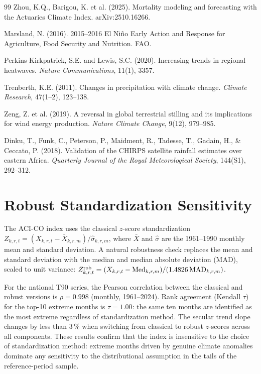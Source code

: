 \documentclass[12pt]{article}
\begin{document}
\begin{thebibliography}{99}
Zhou, K.Q., Barigou, K. et al. (2025).
Mortality modeling and forecasting with the Actuaries Climate Index.
arXiv:2510.16266.
 
Marsland, N. (2016).
2015--2016 El Ni\~no Early Action and Response for Agriculture, Food Security and Nutrition.
FAO.
 
Perkins-Kirkpatrick, S.E. and Lewis, S.C. (2020).
Increasing trends in regional heatwaves.
\emph{Nature Communications}, 11(1), 3357.
 
Trenberth, K.E. (2011).
Changes in precipitation with climate change.
\emph{Climate Research}, 47(1--2), 123--138.
 
Zeng, Z. et al. (2019).
A reversal in global terrestrial stilling and its implications for wind energy production.
\emph{Nature Climate Change}, 9(12), 979--985.

Dinku, T., Funk, C., Peterson, P., Maidment, R., Tadesse, T., Gadain, H., \& Ceccato, P. (2018).
Validation of the CHIRPS satellite rainfall estimates over eastern Africa.
\emph{Quarterly Journal of the Royal Meteorological Society}, 144(S1), 292--312.

\end{thebibliography}
 
\appendix
\section{Robust Standardization Sensitivity}\label{app:robust}
 
The ACI-CO index uses the classical $z$-score standardization $Z_{k,r,t} = (X_{k,r,t} - \bar{X}_{k,r,m}) / \hat{\sigma}_{k,r,m}$, where $\bar{X}$ and $\hat{\sigma}$ are the 1961--1990 monthly mean and standard deviation. A natural robustness check replaces the mean and standard deviation with the median and median absolute deviation (MAD), scaled to unit variance: $Z^{\rm rob}_{k,r,t} = (X_{k,r,t} - \mathrm{Med}_{k,r,m}) / (1.4826\,\mathrm{MAD}_{k,r,m})$.

For the national T90 series, the Pearson correlation between the classical and robust versions is $\rho = 0.998$ (monthly, 1961--2024). Rank agreement (Kendall $\tau$) for the top-10 extreme months is $\tau = 1.00$: the same ten months are identified as the most extreme regardless of standardization method. The secular trend slope changes by less than 3\,\% when switching from classical to robust $z$-scores across all components. These results confirm that the index is insensitive to the choice of standardization method: extreme months driven by genuine climate anomalies dominate any sensitivity to the distributional assumption in the tails of the reference-period sample.
 
\end{document}
